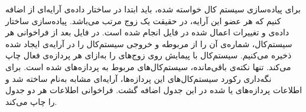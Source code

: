 برای پیاده‌سازی سیستم کال خواسته شده، باید ابتدا در ساختار داده‌ی
آرایه‌ای از
اضافه کنیم که هر عضو این آرایه، در حقیقت یک زوج مرتب
می‌باشد. پیاده‌سازی ساختار داده‌ی
و تغییرات اعمال شده در فایل
انجام شده است. در فایل
بعد از فراخوانی هر سیستم‌کال، شماره‌ی آن‌ را از
مربوطه و خروجی سیستم‌کال را در آرایه‌ی ایجاد شده ذخیره می‌کنیم. سیستم‌کال
با پیمایش روی
زوج‌های
را به‌ازای هر پردازه‌ی فعال چاپ می‌کند. تنها نکته‌ی باقی‌مانده، سیستم‌کال‌های مربوط به پردازه‌های
شده است. برای نگه‌داری رکورد سیستم‌کال‌های این پردازه‌ها، آرایه‌ای مشابه
به‌نام
ساخته شد و اطلاعات پردازه‌های
 یا 
شده در این جدول اضافه گشت. فراخوانی
اطلاعات هر دو جدول را چاپ می‌کند.